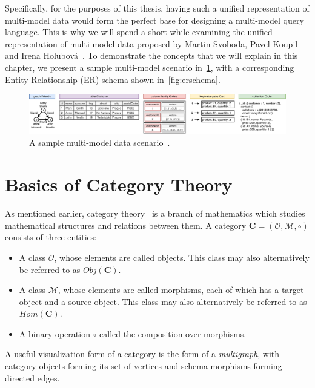 Specifically, for the purposes of this thesis, having such a unified representation of multi-model data would form the perfect base for designing a multi-model query language.
This is why we will spend a short while examining the unified representation of multi-model data proposed by Martin Svoboda, Pavel Koupil and Irena Holubov{\'a}~\cite{unified_representation}\cite{one_model}.
To demonstrate the concepts that we will explain in this chapter, we present a sample multi-model scenario in~\cref{fig:datamodel}, with a corresponding Entity Relationship (ER) schema shown in~\cref{fig:erschema}. 

\begin{figure}[ht]
\centering
\includegraphics[width=\textwidth]{img/fig_data-models.pdf} 
\caption{A sample multi-model data scenario~\cite{unified_representation}.}
\label{fig:datamodel}
\end{figure}

\section{Basics of Category Theory}

As mentioned earlier, category theory~\cite{category_theory} is a branch of mathematics which
studies mathematical structures and relations between them.
A category $\mathbf{C} = (\mathcal{O}, \mathcal{M}, \circ)$ consists of three entities:

\begin{itemize}
    \item A class $\mathcal{O}$, whose elements are called objects. This class may also alternatively be referred to as $Obj(\mathbf{C})$.
    \item A class $\mathcal{M}$, whose elements are called morphisms, each of which has a target object and a source object. This class may also alternatively be referred to as $Hom(\mathbf{C})$.
    \item A binary operation $\circ$ called the composition over morphisms.
\end{itemize}

A useful visualization form of a category is the form of a \textit{multigraph}, with category objects forming its set of vertices and schema morphisms forming directed edges.


